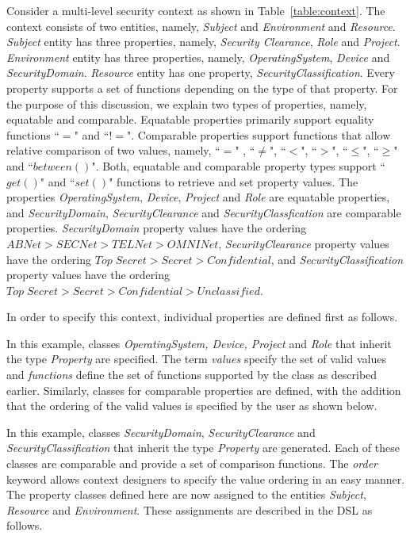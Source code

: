 Consider a multi-level security context as shown in Table~\ref{table:context}. The context consists of two entities, namely, {\em Subject} and {\em Environment} and {\em Resource}. {\em Subject} entity has three properties, namely, {\em Security Clearance}, {\em Role} and {\em Project}. {\em Environment} entity has three properties, namely, {\em OperatingSystem}, {\em Device} and {\em SecurityDomain}. {\em Resource} entity has one property, {\em SecurityClassification}. Every property supports a set of functions depending on the type of that property. For the purpose of this discussion, we explain two types of properties, namely, equatable and comparable. Equatable properties primarily support equality functions  ``$=$" and ``$!=$". Comparable properties support functions that allow relative comparison of two values, namely, ``$=$" , ``$\ne$", ``$<$", ``$>$",  ``$\leq$", ``$\geq$" and ``$between()$". Both, equatable and comparable property types support ``$get()$" and ``$set()$" functions to retrieve and set property values. The properties {\em OperatingSystem}, {\em Device}, {\em Project} and {\em Role} are equatable properties, and {\em SecurityDomain}, {\em SecurityClearance} and {\em SecurityClassfication} are comparable properties. {\em SecurityDomain} property values have the ordering $ABNet > SECNet > TELNet > OMNINet$,  {\em SecurityClearance} property values have the ordering $Top\;Secret > Secret > Confidential$, and {\em SecurityClassification} property values have the ordering $Top\;Secret > Secret > Confidential > Unclassified$. 

In order to specify this context, individual properties are defined first as follows. 


	
In this example, classes  {\em OperatingSystem, Device, Project} and {\em Role} that inherit the type {\em Property} are specified. The term {\em values} specify the set of valid values and {\em functions} define the set of functions supported by the class as described earlier. Similarly, classes for comparable properties are defined, with the addition that the ordering of the valid values is specified by the user as shown below. 



In this example, classes {\em SecurityDomain}, {\em SecurityClearance} and {\em SecurityClassification} that inherit the type {\em Property} are generated. Each of these classes are comparable and provide a set of comparison functions. The {\em order} keyword allows context designers to specify the value ordering in an easy manner. The property classes defined here are now assigned to the entities {\em Subject}, {\em Resource} and {\em Environment}. These assignments are described in the DSL as follows. 

